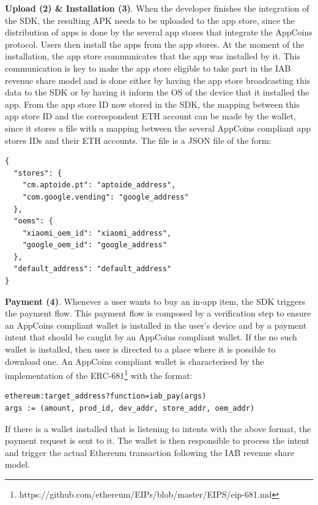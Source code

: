 \noindent \textbf{Upload (2) \& Installation (3)}. When the developer finishes the integration of the SDK, the resulting APK needs to be uploaded to the app store, since the distribution of apps is done by the several app stores that integrate the AppCoins protocol. Users then install the apps from the app stores. At the moment of the installation, the app store communicates that the app was installed by it. This communication is key to make the app store eligible to take part in the IAB revenue share model and is done either by having the app store broadcasting this data to the SDK or by having it inform the OS of the device that it installed the app. From the app store ID now stored in the SDK, the mapping between this app store ID and the correspondent ETH account can be made by the wallet, since it stores a file with a mapping between the several AppCoins compliant app stores IDs and their ETH accounts. The file is a JSON file of the form:
\begin{tcolorbox}[enhanced jigsaw,sharp corners, drop fuzzy shadow=ShadowColor]
\begin{lstlisting}
{
  "stores": {
    "cm.aptoide.pt": "aptoide_address",
    "com.google.vending": "google_address"
  },
  "oems": {
    "xiaomi_oem_id": "xiaomi_address",
    "google_oem_id": "google_address"
  },
  "default_address": "default_address"
}
\end{lstlisting}
\end{tcolorbox} 

\vspace{0.2cm} \noindent \textbf{Payment (4)}. Whenever a user wants to buy an in-app item, the SDK triggers the payment flow. This payment flow is composed by a verification step to ensure an AppCoins compliant wallet is installed in the user's device and by a payment intent that should be caught by an AppCoins compliant wallet. If the no such wallet is installed, then user is directed to a place where it is possible to download one. An AppCoins compliant wallet is characterised by the implementation of the ERC-681\footnote{https://github.com/ethereum/EIPs/blob/master/EIPS/eip-681.md} with the format:
\begin{lstlisting}
ethereum:target_address?function=iab_pay(args)
args := (amount, prod_id, dev_addr, store_addr, oem_addr)
\end{lstlisting}

If there is a wallet installed that is listening to intents with the above format, the payment request is sent to it. The wallet is then responsible to process the intent and trigger the actual Ethereum transaction following the IAB revenue share model. \\

